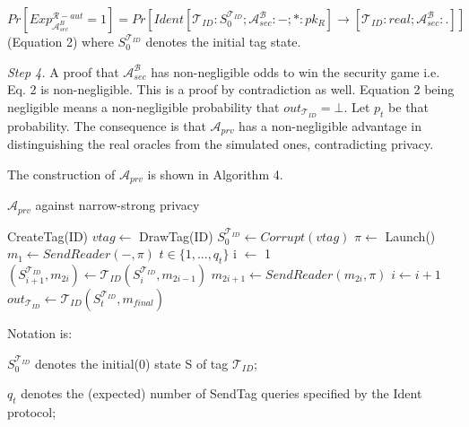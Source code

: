     $Pr[Exp_{\mathcal{A}_{sec}^{B}}^{\mathcal{R}-aut} = 1] = Pr[Ident[\mathcal{T}_{ID}:S_0^{\mathcal{T}_{ID}}; \mathcal{A}_{sec}^{\mathcal{B}}:-; *:pk_{R}]
    \rightarrow [\mathcal{T}_{ID}:real; \mathcal{A}_{sec}^{\mathcal{B}}:.]]$ (Equation 2) where $S_0^{\mathcal{T}_{ID}}$ denotes the initial tag state.
    
    \textit{Step 4.} A proof that $\mathcal{A}_{sec}^{\mathcal{B}}$ has non-negligible odds to win the security game i.e. Eq. 2 is non-negligible.
    This is a proof by contradiction as well. Equation 2 being negligible means a non-negligible probability that $out_{\mathcal{T}_{ID}} = \bot$.
    Let $p_t$ be that probability. The consequence is that $\mathcal{A}_{prv}$ has a non-negligible advantage in distinguishing the real oracles 
    from the simulated ones, contradicting privacy.

    The construction of $\mathcal{A}_{prv}$ is shown in Algorithm 4.
    
    \begin{algorithm}[H] %
        \centering
        \caption{$\mathcal{A}_{prv}$ against narrow-strong privacy}
        \begin{algorithmic}[1] %
            \State CreateTag(ID)
            \State $vtag \leftarrow$ DrawTag(ID)
            \State $S_0^{\mathcal{T}_{ID}} \gets Corrupt(vtag)$
            \State $\pi \leftarrow$ Launch() 
            \State $m_1 \leftarrow SendReader(-,\pi)$ 
            \State $t \in \{1, ..., q_t\}$
            \State i $\leftarrow$ 1
                \State $(S_{i+1}^{\mathcal{T}_{ID}}, m_{2i}) \gets 
                    \mathcal{T}_{ID}(S_{i}^{\mathcal{T}_{ID}}, m_{2i-1})$ 
                \State $m_{2i+1} \gets SendReader(m_{2i}, \pi)$
                \State $i \gets i+1$
            \EndWhile
            \State $out_{\mathcal{T}_{ID}} \gets \mathcal{T}_{ID}(S_t^{\mathcal{T}_{ID}}, m_{final})$
                \State {}
            \Else
                \State {}
            \EndIf
        \end{algorithmic}
    \end{algorithm}

    Notation is: 

    $S_0^{\mathcal{T}_{ID}}$ denotes the initial(0) state S of tag $\mathcal{T}_{ID}$;

    $q_t$ denotes the (expected) number of SendTag queries specified by the Ident protocol;

